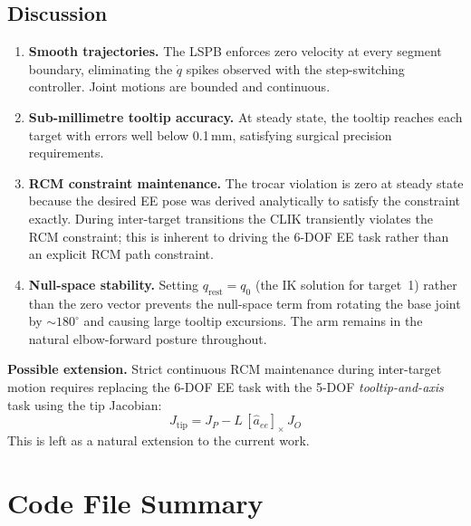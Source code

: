 \documentclass[11pt,a4paper]{article}
\begin{document}
\subsection{Discussion}
\begin{enumerate}
  \item \textbf{Smooth trajectories.} The LSPB enforces zero velocity at every
        segment boundary, eliminating the $\dot{q}$ spikes observed with the
        step-switching controller. Joint motions are bounded and continuous.
  \item \textbf{Sub-millimetre tooltip accuracy.} At steady state, the tooltip
        reaches each target with errors well below 0.1\,mm, satisfying surgical
        precision requirements.
  \item \textbf{RCM constraint maintenance.} The trocar violation is zero at
        steady state because the desired EE pose was derived analytically to
        satisfy the constraint exactly. During inter-target transitions the CLIK
        transiently violates the RCM constraint; this is inherent to driving the
        6-DOF EE task rather than an explicit RCM path constraint.
  \item \textbf{Null-space stability.} Setting $q_{\mathrm{rest}}=q_0$ (the IK
        solution for target~1) rather than the zero vector prevents the
        null-space term from rotating the base joint by ${\sim}180^{\circ}$ and causing
        large tooltip excursions. The arm remains in the natural elbow-forward
        posture throughout.
\end{enumerate}

\textbf{Possible extension.} Strict continuous RCM maintenance during
inter-target motion requires replacing the 6-DOF EE task with the 5-DOF
\emph{tooltip-and-axis} task using the tip Jacobian:
\begin{equation}
  J_{\mathrm{tip}} = J_P - L\,[\hat{a}_{ee}]_\times\,J_O
\end{equation}
This is left as a natural extension to the current work.

\section{Code File Summary}
\end{document}
